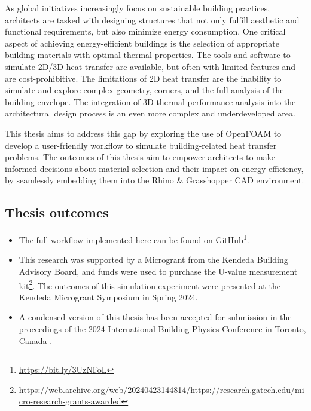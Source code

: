 \thispagestyle{empty}
\begin{summary}
\enlargethispage{2em}

As global initiatives increasingly focus on sustainable building practices, architects are tasked with designing structures that not only fulfill aesthetic and functional requirements, but also minimize energy consumption. One critical aspect of achieving energy-efficient buildings is the selection of appropriate building materials with optimal thermal properties. 
The tools and software to simulate 2D/3D heat transfer are available, but often with limited features and are cost-prohibitive. The limitations of 2D heat transfer are the inability to simulate and explore complex geometry, corners, and the full analysis of the building envelope.
The integration of 3D thermal performance analysis into the architectural design process is an even more complex and underdeveloped area. 


This thesis aims to address this gap by exploring the use of OpenFOAM to develop a user-friendly workflow to simulate building-related heat transfer problems.
The outcomes of this thesis aim to empower architects to make informed decisions about material selection and their impact on energy efficiency, by seamlessly embedding them into the Rhino \& Grasshopper CAD environment. 

\vspace{-0.5em}

\subsection*{Thesis outcomes}


\begin{itemize}[topsep=0pt,itemsep=0pt,partopsep=0pt, parsep=0pt]

    \item  The full workflow implemented here can be found on GitHub\footnote{\url{https://bit.ly/3UzNFoL}}.

    \item This research was supported by a Microgrant   \cite{kendeda} from the Kendeda Building Advisory Board, and funds were used to purchase the U-value measurement kit\footnote{\url{https://web.archive.org/web/20240423144814/https://research.gatech.edu/micro-research-grants-awarded}}. The outcomes of this simulation experiment were presented at the Kendeda Microgrant Symposium in Spring 2024.
    
    \item A condensed version of this thesis has been accepted for submission in the proceedings of the 2024 International Building Physics Conference in Toronto, Canada \cite{MPIbpc}.
    
    

\end{itemize}

\end{summary} 


